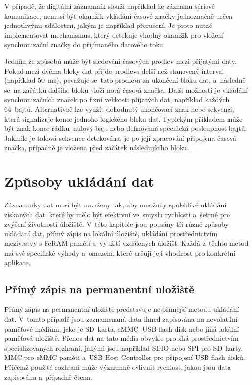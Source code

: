 V případě, že digitální záznamník slouží například ke záznamu sériové komunikace, nemusí být okamžik vkládání časové značky jednoznačně určen jednotlivými událostmi, jakým je například přerušení. Je proto nutné implementovat mechanismus, který detekuje vhodný okamžik pro vložení synchronizační značky do přijímaného datového toku.~\cite{serial_datalogger_timestamping, perny2008zarizeni_cas_znacky}

Jedním ze způsobů může být sledování časových prodlev mezi přijatými daty. Pokud mezi dvěma bloky dat přijde prodleva delší než stanovený interval (například 50~ms), považuje se~tato prodleva za ukončení bloku dat, a~následně se~na začátku dalšího bloku vloží nová časová značka. Další možností je vkládání synchronizačních značek po fixní velikosti přijatých dat, například každých 64~bajtů. Alternativně lze využít dohodnutý ukončovací znak nebo sekvenci, která signalizuje konec jednoho logického bloku dat. Typickým příkladem může být znak konce řádku, nulový bajt nebo definovaná specifická posloupnost bajtů. Jakmile je taková sekvence detekována, je po její zpracování připojena časová značka, případně je vložena před začátek následujícího bloku.~\cite{serial_datalogger_timestamping, perny2008zarizeni_cas_znacky}

\newpage

\section{Způsoby ukládání dat}
Záznamníky dat musí být navrženy tak, aby umožnily spolehlivé ukládání získaných dat, které by mělo být efektivní ve~smyslu rychlosti a~šetrné pro zvýšení životnosti úložiště. V~této kapitole jsou popsány tři různé způsoby ukládání dat, přímý zápis na lokální úložiště, ukládání prostřednictvím mezivrstvy s FeRAM pamětí a~využití vzdálených úložišť. Každá z~těchto metod má své specifické výhody a~omezení, které určují její vhodnost pro konkrétní aplikace.

\subsection{Přímý zápis na permanentní uložiště}
Přímý zápis na permanentní úložiště představuje nejpřímější metodu ukládání dat. V~tomto případě jsou zaznamenaná data ihned zapisována na nevolatilní paměťové médium, jako je SD~karta, eMMC, USB flash disk nebo jiná lokální paměťová uložiště. Přenos dat na tato média obvykle probíhá prostřednictvím specializovaných rozhraní, jakými jsou například SDIO nebo SPI pro SD~karty, MMC pro eMMC paměti a~USB Host Controller pro připojení USB flash disků. Přičemž použité rozhraní může významně ovlivnit rychlost, jakou jsou data zapisována a~případně čtena.~\cite{datalogger_sd_mmc_usb_flash_disk}

